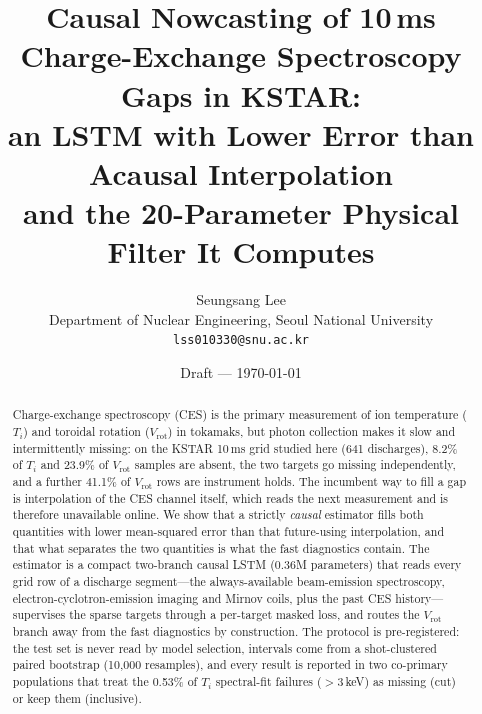 \documentclass[10pt]{article}
\title{\textbf{Causal Nowcasting of 10\,ms Charge-Exchange Spectroscopy Gaps in KSTAR:\\
an LSTM with Lower Error than Acausal Interpolation\\
and the 20-Parameter Physical Filter It Computes}}
\author{%
  Seungsang Lee\\
  Department of Nuclear Engineering, Seoul National University\\
  \texttt{lss010330@snu.ac.kr}
}
\date{Draft --- \today}
\newcommand{\Ti}{\ensuremath{T_i}}
\newcommand{\Vrot}{\ensuremath{V_\mathrm{rot}}}
\begin{document}
\maketitle

\begin{abstract}
Charge-exchange spectroscopy (CES) is the primary measurement of ion temperature
(\Ti) and toroidal rotation (\Vrot) in tokamaks, but photon collection makes it slow
and intermittently missing: on the KSTAR 10\,ms grid studied here (641 discharges),
8.2\% of \Ti{} and 23.9\% of \Vrot{} samples are absent, the two targets go missing
independently, and a further 41.1\% of \Vrot{} rows are instrument holds. The
incumbent way to fill a gap is interpolation of the CES channel itself, which reads
the next measurement and is therefore unavailable online. We show that a strictly
\emph{causal} estimator fills both quantities with lower mean-squared error than that
future-using interpolation, and that what separates the two quantities is what the
fast diagnostics contain. The estimator is a compact two-branch causal LSTM (0.36M
parameters) that reads every grid row of a discharge segment---the always-available
beam-emission spectroscopy, electron-cyclotron-emission imaging and Mirnov coils, plus
the past CES history---supervises the sparse targets through a per-target masked
loss, and routes the \Vrot{} branch away from the fast diagnostics by construction. The protocol
is pre-registered: the test set is never read by model selection, intervals come from
a shot-clustered paired bootstrap (10{,}000 resamples), and every result is reported
in two co-primary populations that treat the 0.53\% of \Ti{} spectral-fit failures
($>$3\,keV) as missing (cut) or keep them (inclusive).


\end{abstract}
\end{document}
